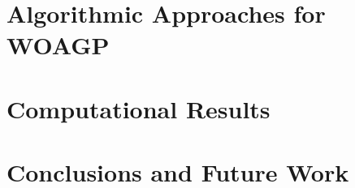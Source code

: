\documentclass[runningheads,a4paper]{llncs}
\begin{document}
     \section{Algorithmic Approaches for WOAGP}
          
     \section{Computational Results}
     
     \section{Conclusions and Future Work}
     
     
  
    
    
\end{document}
